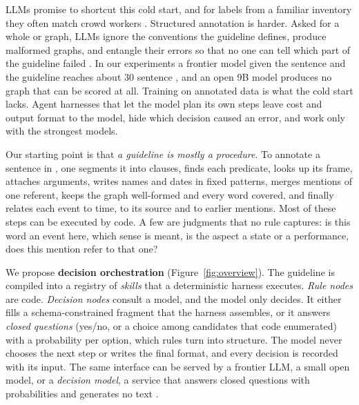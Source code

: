 LLMs promise to shortcut this cold start, and for labels from a familiar inventory they often match crowd workers \citep{wang2021reduce,gilardi2023chatgpt,tan2024annotation}. Structured annotation is harder. Asked for a whole \umr or \amr graph, LLMs ignore the conventions the guideline defines, produce malformed graphs, and entangle their errors so that no one can tell which part of the guideline failed \citep{ettinger2023expert,sun2024chinese}. In our experiments a frontier model given the sentence and the guideline reaches about 30 sentence \F, and an open 9B model produces no graph that can be scored at all. Training on annotated data is what the cold start lacks. Agent harnesses that let the model plan its own steps \citep{yao2023react} leave cost and output format to the model, hide which decision caused an error, and work only with the strongest models.

Our starting point is that \emph{a guideline is mostly a procedure}. To annotate a sentence in \umr, one segments it into clauses, finds each predicate, looks up its frame, attaches arguments, writes names and dates in fixed patterns, merges mentions of one referent, keeps the graph well-formed and every word covered, and finally relates each event to time, to its source and to earlier mentions. Most of these steps can be executed by code. A few are judgments that no rule captures: is this word an event here, which sense is meant, is the aspect a state or a performance, does this mention refer to that one?

We propose \textbf{decision orchestration} (Figure~\ref{fig:overview}). The guideline is compiled into a registry of \emph{skills} that a deterministic harness executes. \emph{Rule nodes} are code. \emph{Decision nodes} consult a model, and the model only decides. It either fills a schema-constrained fragment that the harness assembles, or it answers \emph{closed questions} (yes/no, or a choice among candidates that code enumerated) with a probability per option, which rules turn into structure. The model never chooses the next step or writes the final format, and every decision is recorded with its input. The same interface can be served by a frontier LLM, a small open model, or a \emph{decision model}, a service that answers closed questions with probabilities and generates no text \citep{typesafe2026jev,openai2026decisions,microsoft2026decision}.

